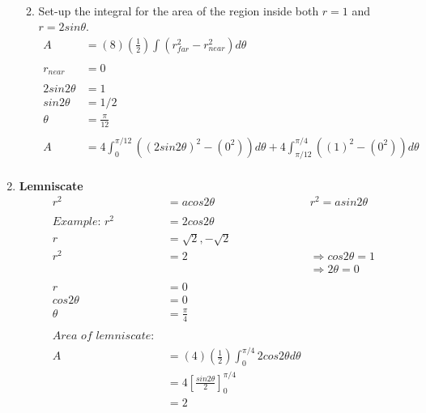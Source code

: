 \documentclass{article}
\begin{document}
\begin{enumerate}
\begin{enumerate}
\begin{align*}
        \end{align*}
        \item Set-up the integral for the area of the region inside both $r=1$ and $r=2sin\theta$.
        \begin{align*}
            A&=(8)(\frac{1}{2})\int (r_{far}^2-r_{near}^2) d\theta \\
            \\
            r_{near}&=0 \\
            \\
            2sin2\theta&=1 \\
            sin2\theta&=1/2 \\
            \theta&=\frac{\pi}{12} \\
            \\
            A&=4\int_{0}^{\pi/12} ((2sin2\theta)^2-(0^2)) d\theta + 4\int_{\pi/12}^{\pi/4} ((1)^2-(0^2)) d\theta \\
        \end{align*}
    \end{enumerate}
    \item \textbf{Lemniscate} \\
    \begin{align*}
        r^2&=acos2\theta &r^2=asin2\theta \\
        \\
        \textit{Example: } r^2&=2cos2\theta \\
        r&=\sqrt{2},-\sqrt{2} \\
        r^2&=2&\Rightarrow cos2\theta=1 \\
        &&\Rightarrow 2\theta=0 \\
        \\
        r&=0 \\
        cos2\theta&=0 \\
        \theta&=\frac{\pi}{4} \\
        \\
        \textit{Area of lemniscate: } \\
        A&=(4)(\frac{1}{2})\int_{0}^{\pi/4}2cos2\theta d\theta \\
        &=4[\frac{sin2\theta}{2}]_{0}^{\pi/4} \\
        &=2 \\
    \end{align*}
\end{enumerate}
\end{document}

